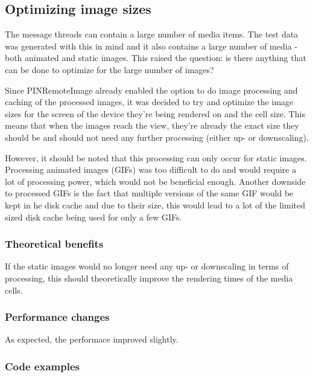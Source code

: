 \documentclass[a4paper,12pt]{article}
\begin{document}
\subsection{Optimizing image sizes}
The message threads can contain a large number of media items. The test data was generated with this in mind and it also contains a large number of media - both animated and static images. This raised the question: is there anything that can be done to optimize for the large number of images?

Since PINRemoteImage already enabled the option to do image processing and caching of the processed images, it was decided to try and optimize the image sizes for the screen of the device they're being rendered on and the cell size. This means that when the images reach the view, they're already the exact size they should be and should not need any further processing (either up- or downscaling).

However, it should be noted that this processing can only occur for static images. Processing animated images (GIFs) was too difficult to do and would require a lot of processing power, which would not be beneficial enough. Another downside to processed GIFs is the fact that multiple versions of the same GIF would be kept in he disk cache and due to their size, this would lead to a lot of the limited sized disk cache being used for only a few GIFs.

\subsubsection*{Theoretical benefits}
If the static images would no longer need any up- or downscaling in terms of processing, this should theoretically improve the rendering times of the media cells.

\subsubsection*{Performance changes}
As expected, the performace improved slightly.


\subsubsection*{Code examples}
\end{document}
